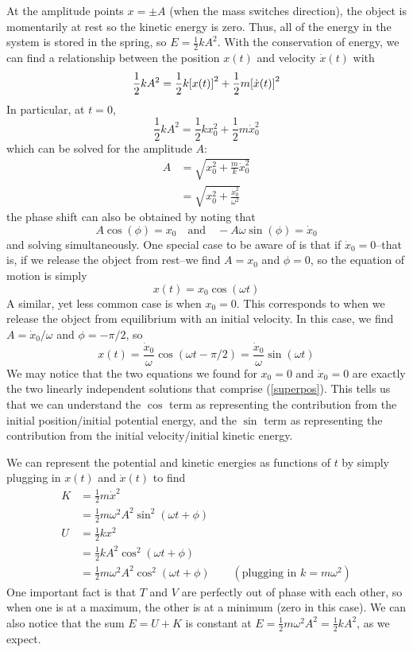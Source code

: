 At the amplitude points $x=\pm A$ (when the mass switches direction), the object is momentarily at rest so the kinetic energy is zero. Thus, all of the energy in the system is stored in the spring, so $E = \frac{1}{2}kA^2$. With the conservation of energy, we can find a relationship between the position $x(t)$ and velocity $\dot x(t)$ with
\[ \frac{1}{2}kA^2 = \frac{1}{2}k\bqty{x(t)}^2 + \frac{1}{2}m\bqty{\dot x(t)}^2\]
In particular, at $t=0$,
\[ \frac{1}{2}kA^2 = \frac{1}{2}kx_0^2 + \frac{1}{2}m\dot x_0^2 \]
which can be solved for the amplitude $A$:
\begin{align}
    A &= \sqrt{x_0^2 + \frac{m}{k}\dot x_0^2} \nonumber \\
    &= \sqrt{x_0^2 + \frac{\dot x_0^2}{\omega^2}}
\end{align}
the phase shift can also be obtained by noting that
\[ A\cos(\phi) = x_0 \quad\text{and}\quad -A\omega\sin(\phi) = \dot x_0\]
and solving simultaneously. One special case to be aware of is that if $\dot x_0 =0$--that is, if we release the object from rest--we find $A = x_0$ and $\phi = 0$, so the equation of motion is simply
\[ x(t) = x_0\cos(\omega t) \]
A similar, yet less common case is when $x_0 = 0$. This corresponds to when we release the object from equilibrium with an initial velocity. In this case, we find $A = \dot x_0/\omega$ and $\phi = -\pi/2$, so
\[ x(t) = \frac{\dot x_0}{\omega}\cos(\omega t - \pi/2) = \frac{\dot x_0}{\omega}\sin(\omega t)\]
We may notice that the two equations we found for $x_0 = 0$ and $\dot x_0 = 0$ are exactly the two linearly independent solutions that comprise (\ref{superpos}). This tells us that we can understand the $\cos$ term as representing the contribution from the initial position/initial potential energy, and the $\sin$ term as representing the contribution from the initial velocity/initial kinetic energy.

We can represent the potential and kinetic energies as functions of $t$ by simply plugging in $x(t)$ and $\dot x(t)$ to find
\begin{align}
    K &= \frac{1}{2}m\dot x^2 \nonumber \\ 
    &= \frac{1}{2}m\omega^2 A^2\sin^2(\omega t + \phi)   \\
    U &= \frac{1}{2}kx^2 \nonumber \\
    &= \frac{1}{2}kA^2\cos^2(\omega t+\phi) \nonumber \\
    &= \frac{1}{2}m\omega^2A^2\cos^2(\omega t + \phi) \quad\quad(\text{plugging in } k = m\omega^2 )
\end{align}
One important fact is that $T$ and $V$ are perfectly out of phase with each other, so when one is at a maximum, the other is at a minimum (zero in this case). We can also notice that the sum $E = U +K$ is constant at $E = \frac{1}{2}m\omega^2A^2 = \frac{1}{2}kA^2$, as we expect.
